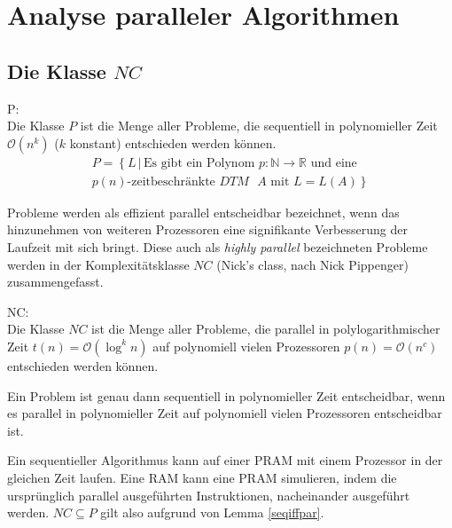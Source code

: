 \section{Analyse paralleler Algorithmen}

\subsection{Die Klasse $NC$}
\begin{define}
    P: \\
    Die Klasse $P$ ist die Menge aller Probleme, die sequentiell in 
    polynomieller Zeit $\mathcal{O}(n^k)$ ($k$ konstant) entschieden werden können.
    \begin{equation}
        \begin{split}
            P = \left\{ L \, | \, \text{Es gibt ein Polynom } p\colon \mathbb{N} \to \mathbb{R} \right.
            \text{ und eine} \\ \left. \text{$p(n)$-zeitbeschränkte $DTM$ $A$ mit } L = L(A) \right\}
        \end{split}
    \end{equation}\cite[S.205]{fgi1}\cite[S.44]{greenlaw}
\end{define}
Probleme werden als effizient parallel entscheidbar bezeichnet, wenn das
hinzunehmen von weiteren Prozessoren eine signifikante Verbesserung der
Laufzeit mit sich bringt.
Diese auch als \emph{highly parallel} bezeichneten Probleme werden in der
Komplexitätsklasse $NC$ (Nick's class, nach Nick Pippenger) zusammengefasst.
\begin{define}
    NC: \\
    Die Klasse $NC$ ist die Menge aller Probleme, die parallel in
    polylogarithmischer Zeit $t(n) = \mathcal{O}(\log^k n)$ auf polynomiell
    vielen Prozessoren $p(n) = \mathcal{O}(n^c)$ entschieden werden können.
    \cite[S.44]{greenlaw}
\end{define}

\begin{lemma}
    Ein Problem ist genau dann sequentiell in polynomieller Zeit entscheidbar,
    wenn es parallel in polynomieller Zeit auf polynomiell vielen Prozessoren
    entscheidbar ist.\cite[S.44]{greenlaw}
    \label{seqiffpar}
\end{lemma}
Ein sequentieller Algorithmus kann auf einer PRAM mit einem Prozessor in der
gleichen Zeit laufen.
Eine RAM kann eine PRAM simulieren, indem die ursprünglich parallel
ausgeführten Instruktionen, nacheinander ausgeführt werden.
$NC \subseteq P$ gilt also aufgrund von Lemma \ref{seqiffpar}.

